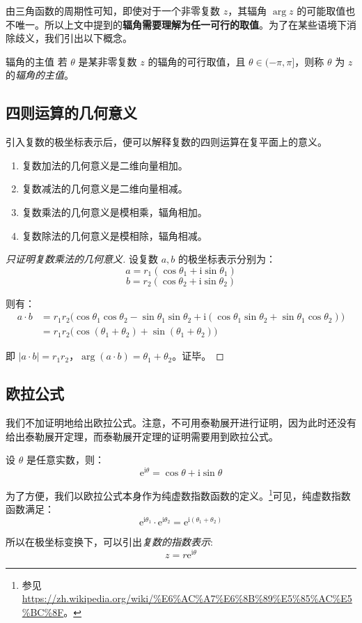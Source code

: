 由三角函数的周期性可知，即使对于一个非零复数 $z$，其辐角 $\arg z$ 的可能取值也不唯一。所以上文中提到的\textbf{辐角需要理解为任一可行的取值}。为了在某些语境下消除歧义，我们引出以下概念。

\begin{definition}{辐角的主值}
	若 $\theta$ 是某非零复数 $z$ 的辐角的可行取值，且 $\theta \in (-\pi, \pi]$，则称 $\theta$ 为 $z$ 的\emph{辐角的主值}。
\end{definition}

\subsection{四则运算的几何意义}

引入复数的极坐标表示后，便可以解释复数的四则运算在复平面上的意义。

\begin{enumerate}
	\item 复数加法的几何意义是二维向量相加。
	\item 复数减法的几何意义是二维向量相减。
	\item 复数乘法的几何意义是模相乘，辐角相加。
	\item 复数除法的几何意义是模相除，辐角相减。
\end{enumerate}

\begin{proof}[只证明复数乘法的几何意义]
	设复数 $a, b$ 的极坐标表示分别为：
	$$
	a = r_1 (\cos \theta_1 + \mathrm i \sin \theta_1)
	$$$$
	b = r_2 (\cos \theta_2 + \mathrm i \sin \theta_2)
	$$

	则有：
	$$
	\begin{aligned}
		a \cdot b &= r_1 r_2 \bigl( \cos \theta_1 \cos \theta_2 - \sin \theta_1 \sin \theta_2 + \mathrm i (\cos \theta_1 \sin \theta_2 + \sin \theta_1 \cos \theta_2) \bigr)
		\\&=
		r_1 r_2 \bigl( \cos(\theta_1 + \theta_2) + \sin(\theta_1 + \theta_2) \bigr)
	\end{aligned}
	$$

	即 $|a \cdot b| = r_1 r_2$，$\arg(a \cdot b) = \theta_1 + \theta_2$。证毕。
\end{proof}

\subsection{欧拉公式}

我们不加证明地给出欧拉公式。注意，不可用泰勒展开进行证明，因为此时还没有给出泰勒展开定理，而泰勒展开定理的证明需要用到欧拉公式。

\begin{theorem}[欧拉公式]
	设 $\theta$ 是任意实数，则：
	$$
	\mathrm e^{\mathrm i \theta} = \cos \theta + \mathrm i \sin \theta
	$$
\end{theorem}

为了方便，我们以欧拉公式本身作为纯虚数指数函数的定义。\footnote{参见 \url{https://zh.wikipedia.org/wiki/\%E6\%AC\%A7\%E6\%8B\%89\%E5\%85\%AC\%E5\%BC\%8F}。}可见，纯虚数指数函数满足：
$$
\mathrm e^{\mathrm i \theta_1} \cdot \mathrm e^{\mathrm i \theta_2} = \mathrm e^{\mathrm i (\theta_1 + \theta_2)}
$$

所以在极坐标变换下，可以引出\emph{复数的指数表示}:
$$
z = r \mathrm e^{\mathrm i \theta}
$$